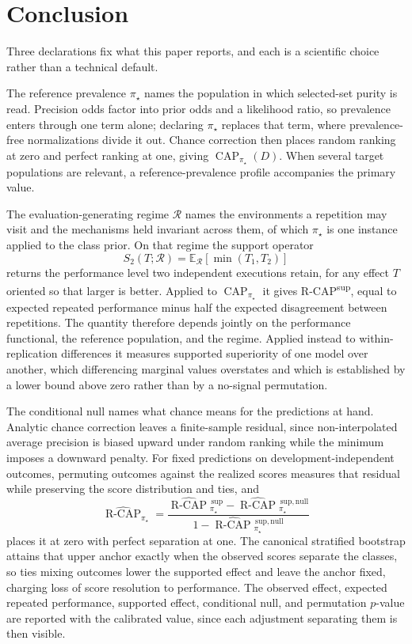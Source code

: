 \documentclass[11pt]{article}
\newcommand{\CAP}{\operatorname{CAP}}
\newcommand{\Regime}{\mathcal{R}}
\newcommand{\Tpi}{\CAP_{\pi_\star}}
\newcommand{\E}{\mathbb{E}}
\newcommand{\RCAPHat}{\widehat{\operatorname{R\text{-}CAP}}{}^{\,\mathrm{sup}}_{\pi_\star}}
\newcommand{\RCAPnullHat}{\widehat{\operatorname{R\text{-}CAP}}{}^{\,\mathrm{sup,null}}_{\pi_\star}}
\newcommand{\RCAPcalHat}{\widehat{\operatorname{R\text{-}CAP}}_{\pi_\star}}
\theoremstyle{remark}
\begin{document}
\section{Conclusion}

Three declarations fix what this paper reports, and each is a scientific choice rather than a technical default.

The reference prevalence $\pi_\star$ names the population in which selected-set purity is read. Precision odds factor into prior odds and a likelihood ratio, so prevalence enters through one term alone; declaring $\pi_\star$ replaces that term, where prevalence-free normalizations divide it out. Chance correction then places random ranking at zero and perfect ranking at one, giving $\Tpi(D)$. When several target populations are relevant, a reference-prevalence profile accompanies the primary value.

The evaluation-generating regime $\Regime$ names the environments a repetition may visit and the mechanisms held invariant across them, of which $\pi_\star$ is one instance applied to the class prior. On that regime the support operator
\[
S_2(T;\Regime)
=
\E_{\Regime}\left[\min(T_1,T_2)\right]
\]
returns the performance level two independent executions retain, for any effect $T$ oriented so that larger is better. Applied to $\CAP_{\pi_\star}$ it gives R-CAP\textsuperscript{sup}, equal to expected repeated performance minus half the expected disagreement between repetitions. The quantity therefore depends jointly on the performance functional, the reference population, and the regime. Applied instead to within-replication differences it measures supported superiority of one model over another, which differencing marginal values overstates and which is established by a lower bound above zero rather than by a no-signal permutation.

The conditional null names what chance means for the predictions at hand. Analytic chance correction leaves a finite-sample residual, since non-interpolated average precision is biased upward under random ranking while the minimum imposes a downward penalty. For fixed predictions on development-independent outcomes, permuting outcomes against the realized scores measures that residual while preserving the score distribution and ties, and
\[
\RCAPcalHat
=
\frac{\RCAPHat-\RCAPnullHat}{1-\RCAPnullHat}
\]
places it at zero with perfect separation at one. The canonical stratified bootstrap attains that upper anchor exactly when the observed scores separate the classes, so ties mixing outcomes lower the supported effect and leave the anchor fixed, charging loss of score resolution to performance. The observed effect, expected repeated performance, supported effect, conditional null, and permutation $p$-value are reported with the calibrated value, since each adjustment separating them is then visible.
\end{document}
